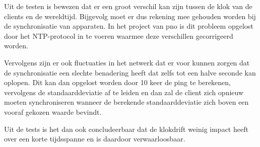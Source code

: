 Uit de testen is bewezen dat er een groot verschil kan zijn tussen de klok van de clients en de wereldtijd. Bijgevolg moet er dus rekening mee gehouden worden bij de synchronisatie van apparaten. In het project van pno is dit probleem opgelost door het NTP-protocol in te voeren waarmee deze verschillen gecorrigeerd worden.

Vervolgens zijn er ook fluctuaties in het netwerk dat er voor kunnen zorgen dat de synchronisatie een slechte benadering heeft dat zelfs tot een halve seconde kan oplopen. Dit kan dan opgelost worden door 10 keer de ping te berekenen, vervolgens de standaarddeviatie af te leiden en dan zal de client zich opnieuw moeten synchroniseren wanneer de berekende standaarddeviatie zich boven een vooraf gekozen waarde bevindt.

Uit de tests is het dan ook concludeerbaar dat de klokdrift weinig impact heeft over een korte tijdsspanne en is daardoor verwaarloosbaar.
